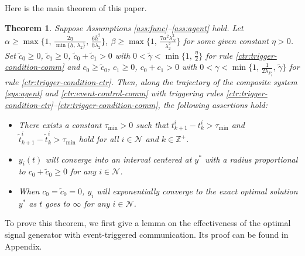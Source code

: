 \documentclass[sort&compress]{IEEEtran}
\newcommand{\lm}{\lambda}
\newcommand{\N}{\mathcal{N}}
\newtheorem{thm}{Theorem}
\begin{document}
Here is the main theorem of this paper. 
\begin{thm}\label{thm:main}
    Suppose Assumptions \ref{ass:func}--\ref{ass:agent} hold. Let $\alpha\geq \max\{1,\, \frac{2\eta}{\min\{\underline{h},\,\lambda_2\}},\, \frac{6\bar h^2}{\underline{h}\lm_2}\}$, $\beta\geq \max\{1,\, \frac{7\alpha^2\lambda_N^2}{\lambda_2^2} \}$ for some given constant $\eta>0$. Set $\tilde c_0\geq 0$, $\tilde c_1\geq 0$, $\tilde c_0+\tilde c_1>0$ with $0<\tilde \gamma<\min\{1,\,\frac{\eta }{2}\}$ for rule \eqref{ctr:trigger-condition-comm} and $c_0\geq \tilde c_0$, $c_1\geq 0$, $c_0+c_1>0$ with $0<\gamma<\min\{1,\,\frac{1}{2\lm_{P_i}},\, \tilde \gamma \}$ for rule \eqref{ctr:trigger-condition-ctr}. Then, along the trajectory of the composite system \eqref{sys:agent} and \eqref{ctr:event-control-comm} with triggering rules \eqref{ctr:trigger-condition-ctr}--\eqref{ctr:trigger-condition-comm},  the following assertions hold: 
    \begin{itemize}
    	\item[a)] There exists a constant $ \tau_{\min}>0$ such that   $t^i_{k+1}-t^i_k>{\tau}_{\min}$ and $\tilde t^i_{k+1}-\tilde t^i_k>{\tau}_{\min}$  hold for all $i\in \N$ and $k\in \mathbb{Z}^+$.
    	\item[b)] $y_i(t)$ will converge into an interval centered at $y^*$ with a radius proportional to $c_0+\tilde c_0\geq 0$ for any $i\in \mathcal{N}$. 
    	\item[c)] When $c_0=\tilde c_0=0$, $y_i$ will exponentially converge to the exact optimal solution $y^*$ as $t$ goes to $\infty$ for any $i\in \mathcal{N}$. 
    \end{itemize} 
\end{thm} 


To prove this theorem, we first give a lemma on the effectiveness of the optimal signal generator with event-triggered communication. Its proof can be found in Appendix. 
  
\end{document}
